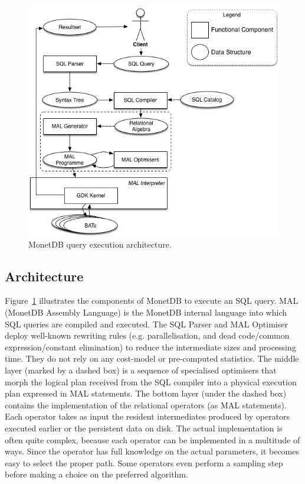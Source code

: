 \documentclass[conference]{IEEEtran}
\begin{document}
\begin{figure}[t]
    \centering\includegraphics[width=.95\columnwidth]{Figures/MDB_impl_arch.png}
    \caption{MonetDB query execution architecture.}
    \label{fig:mdb_arch}
\end{figure}

\subsection{Architecture}
Figure~\ref{fig:mdb_arch} illustrates the components of MonetDB to execute an SQL query.
MAL (MonetDB Assembly Language) is the MonetDB internal language into which SQL queries are compiled and executed.
The SQL Parser and MAL Optimiser deploy well-known rewriting rules (e.g. parallelisation, and dead code/common expression/constant elimination) to reduce the intermediate sizes and processing time.
They do not rely on any cost-model or pre-computed statistics.
%
The middle layer (marked by a dashed box) is a sequence of specialised optimisers that morph the logical plan received from the SQL compiler into a physical execution plan expressed in MAL statements.
The bottom layer (under the dashed box) contains the implementation of the relational operators (as MAL statements).
Each operator takes as input the resident intermediates produced by operators executed earlier or the persistent data on disk.
The actual implementation is often quite complex, because each operator can be implemented in a multitude of ways.
Since the operator has full knowledge on the actual parameters, it becomes easy to select the proper path.
Some operators even perform a sampling step before making a choice on the preferred algorithm.
\end{document}
